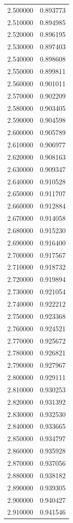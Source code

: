 \begin{tabular}{rr}
2.500000 & 0.893773 \\
2.510000 & 0.894985 \\
2.520000 & 0.896195 \\
2.530000 & 0.897403 \\
2.540000 & 0.898608 \\
2.550000 & 0.899811 \\
2.560000 & 0.901011 \\
2.570000 & 0.902209 \\
2.580000 & 0.903405 \\
2.590000 & 0.904598 \\
2.600000 & 0.905789 \\
2.610000 & 0.906977 \\
2.620000 & 0.908163 \\
2.630000 & 0.909347 \\
2.640000 & 0.910528 \\
2.650000 & 0.911707 \\
2.660000 & 0.912884 \\
2.670000 & 0.914058 \\
2.680000 & 0.915230 \\
2.690000 & 0.916400 \\
2.700000 & 0.917567 \\
2.710000 & 0.918732 \\
2.720000 & 0.919894 \\
2.730000 & 0.921054 \\
2.740000 & 0.922212 \\
2.750000 & 0.923368 \\
2.760000 & 0.924521 \\
2.770000 & 0.925672 \\
2.780000 & 0.926821 \\
2.790000 & 0.927967 \\
2.800000 & 0.929111 \\
2.810000 & 0.930253 \\
2.820000 & 0.931392 \\
2.830000 & 0.932530 \\
2.840000 & 0.933665 \\
2.850000 & 0.934797 \\
2.860000 & 0.935928 \\
2.870000 & 0.937056 \\
2.880000 & 0.938182 \\
2.890000 & 0.939305 \\
2.900000 & 0.940427 \\
2.910000 & 0.941546 \\

\end{tabular}
